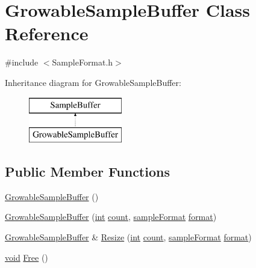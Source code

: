 \hypertarget{class_growable_sample_buffer}{}\section{Growable\+Sample\+Buffer Class Reference}
\label{class_growable_sample_buffer}


{\ttfamily \#include $<$Sample\+Format.\+h$>$}

Inheritance diagram for Growable\+Sample\+Buffer\+:\begin{figure}[H]
\begin{center}
\leavevmode
\includegraphics[height=2.000000cm]{class_growable_sample_buffer}
\end{center}
\end{figure}
\subsection*{Public Member Functions}
\begin{DoxyCompactItemize}
\item 
\hyperlink{class_growable_sample_buffer_a2fef4f35c56c5f4b9e3a7fd7229aebe8}{Growable\+Sample\+Buffer} ()
\item 
\hyperlink{class_growable_sample_buffer_acabd314b033f6e0ff9844bc78510800e}{Growable\+Sample\+Buffer} (\hyperlink{xmltok_8h_a5a0d4a5641ce434f1d23533f2b2e6653}{int} \hyperlink{metrics_8c_afea6e77db19a2f8c91419904fe665a3a}{count}, \hyperlink{include_2audacity_2_types_8h_a9938d2e2f6adef23e745cd80ef379792}{sample\+Format} \hyperlink{_export_p_c_m_8cpp_a317afff57d87a89158c2b038d37b2b08}{format})
\item 
\hyperlink{class_growable_sample_buffer}{Growable\+Sample\+Buffer} \& \hyperlink{class_growable_sample_buffer_a127cfd805b394ab594def65f0dc192c4}{Resize} (\hyperlink{xmltok_8h_a5a0d4a5641ce434f1d23533f2b2e6653}{int} \hyperlink{metrics_8c_afea6e77db19a2f8c91419904fe665a3a}{count}, \hyperlink{include_2audacity_2_types_8h_a9938d2e2f6adef23e745cd80ef379792}{sample\+Format} \hyperlink{_export_p_c_m_8cpp_a317afff57d87a89158c2b038d37b2b08}{format})
\item 
\hyperlink{sound_8c_ae35f5844602719cf66324f4de2a658b3}{void} \hyperlink{class_growable_sample_buffer_abd51b31ddb76230a9b4e042df8db57a1}{Free} ()
\end{DoxyCompactItemize}


